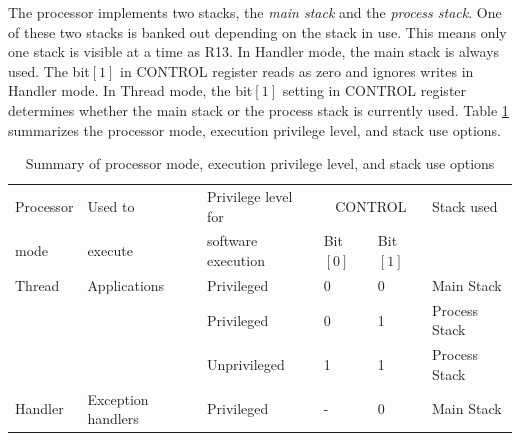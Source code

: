 The processor implements two stacks, the {\em main stack} and the {\em process stack}. 
One of these two stacks is banked out depending on the stack in use. This means only one stack is visible at a time as R13. 
In Handler mode, the main stack is always used. The bit$[1]$ in CONTROL register reads as zero and ignores writes in Handler mode. 
In Thread mode, the bit$[1]$ setting in CONTROL register determines whether
the main stack or the process stack is currently used. 
Table \ref{tb_cm3_mode} summarizes the processor mode, execution privilege level, and stack use options.
\begin{table}[ht]
\begin{center}
\footnotesize{
\begin{tabular}{llllll}
\hline
Processor & Used to & Privilege level for & 
\multicolumn{2}{c}{CONTROL}  & Stack used \\ 
mode      & execute & software execution  & Bit$[0]$ & Bit$[1]$\\ \hline
Thread    & Applications & Privileged   & 0  & 0 & Main Stack \\
          &              & Privileged   & 0  & 1 & Process Stack \\ 
          &              & Unprivileged & 1  & 1 & Process Stack \\ \hline
Handler   &Exception handlers & Privileged & - & 0 & Main Stack \\ \hline
\end{tabular}
}
\caption{Summary of processor mode, execution privilege level, and stack use options}
\label{tb_cm3_mode}
\end{center}
\end{table}




